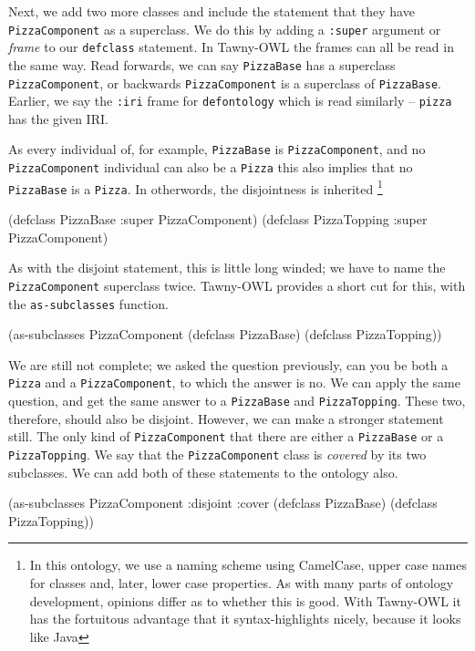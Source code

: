 Next, we add two more classes and include the statement that they have
\verb~PizzaComponent~ as a superclass. We do this by adding a \verb~:super~
argument or \emph{frame} to our \verb~defclass~ statement. In Tawny-OWL the frames
can all be read in the same way. Read forwards, we can say \verb~PizzaBase~
has a superclass \verb~PizzaComponent~, or backwards \verb~PizzaComponent~ is a
superclass of \verb~PizzaBase~. Earlier, we say the \verb~:iri~ frame for
\verb~defontology~ which is read similarly -- \verb~pizza~ has the given IRI.

As every individual of, for example, \verb~PizzaBase~ is \verb~PizzaComponent~, and no
\verb~PizzaComponent~ individual can also be a \verb~Pizza~ this also implies that no
\verb~PizzaBase~ is a \verb~Pizza~. In otherwords, the disjointness is inherited
\footnote{In this ontology, we use a naming scheme using CamelCase, upper case
names for classes and, later, lower case properties. As with many parts of
ontology development, opinions differ as to whether this is good. With
Tawny-OWL it has the fortuitous advantage that it syntax-highlights nicely,
because it looks like Java}

\begin{tawny}
(defclass PizzaBase
  :super PizzaComponent)
(defclass PizzaTopping
  :super PizzaComponent)
\end{tawny}


As with the disjoint statement, this is little long winded; we have to name
the \verb~PizzaComponent~ superclass twice. Tawny-OWL provides a short cut for
this, with the \verb~as-subclasses~ function.

\begin{tawny}
(as-subclasses
 PizzaComponent
 (defclass PizzaBase)
 (defclass PizzaTopping))
\end{tawny}

We are still not complete; we asked the question previously, can you be both a
\verb~Pizza~ and a \verb~PizzaComponent~, to which the answer is no. We can apply the
same question, and get the same answer to a \verb~PizzaBase~ and \verb~PizzaTopping~.
These two, therefore, should also be disjoint. However, we can make a stronger
statement still. The only kind of \verb~PizzaComponent~ that there are either a
\verb~PizzaBase~ or a \verb~PizzaTopping~. We say that the \verb~PizzaComponent~ class is
\emph{covered} by its two subclasses. We can add both of these statements to the
ontology also.

\begin{tawny}
(as-subclasses
 PizzaComponent
 :disjoint :cover
 (defclass PizzaBase)
 (defclass PizzaTopping))
\end{tawny}

